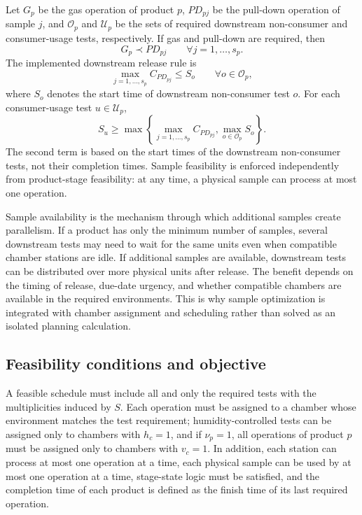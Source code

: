\documentclass[11pt]{article}
\begin{document}
Let \(G_p\) be the gas operation of product \(p\), \(PD_{pj}\) be the pull-down operation of sample \(j\), and \(\mathcal{O}_p\) and \(\mathcal{U}_p\) be the sets of required downstream non-consumer and consumer-usage tests, respectively. If gas and pull-down are required, then
\[
G_p \prec PD_{pj} \qquad \forall j=1,\ldots,s_p.
\]
The implemented downstream release rule is
\[
\max_{j=1,\ldots,s_p} C_{PD_{pj}} \le S_o
\qquad \forall o\in\mathcal{O}_p,
\]
where \(S_o\) denotes the start time of downstream non-consumer test \(o\). For each consumer-usage test \(u\in\mathcal{U}_p\),
\[
S_u \ge
\max\left\{
\max_{j=1,\ldots,s_p} C_{PD_{pj}},
\max_{o\in\mathcal{O}_p} S_o
\right\}.
\]
The second term is based on the start times of the downstream non-consumer tests, not their completion times. Sample feasibility is enforced independently from product-stage feasibility: at any time, a physical sample can process at most one operation.

Sample availability is the mechanism through which additional samples create parallelism. If a product has only the minimum number of samples, several downstream tests may need to wait for the same units even when compatible chamber stations are idle. If additional samples are available, downstream tests can be distributed over more physical units after release. The benefit depends on the timing of release, due-date urgency, and whether compatible chambers are available in the required environments. This is why sample optimization is integrated with chamber assignment and scheduling rather than solved as an isolated planning calculation.

\subsection{Feasibility conditions and objective}
\label{subsec:objective}

A feasible schedule must include all and only the required tests with the multiplicities induced by \(S\). Each operation must be assigned to a chamber whose environment matches the test requirement; humidity-controlled tests can be assigned only to chambers with \(h_c=1\), and if \(\nu_p=1\), all operations of product \(p\) must be assigned only to chambers with \(v_c=1\). In addition, each station can process at most one operation at a time, each physical sample can be used by at most one operation at a time, stage-state logic must be satisfied, and the completion time of each product is defined as the finish time of its last required operation.
\end{document}
